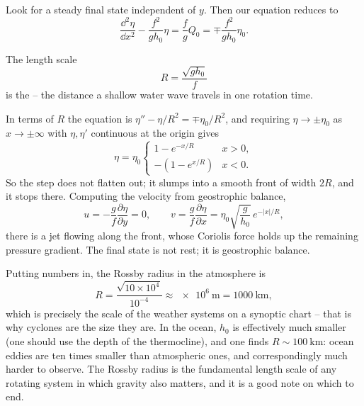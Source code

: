 \documentclass[a4paper]{scrartcl}
\newcommand{\pd}[2]{\frac{\partial #1}{\partial #2}}
\begin{document}
\begin{example}
	Look for a steady final state independent of $y$. Then our equation reduces to
	$$
	\frac{\dd^2\eta}{\dd x^2} - \frac{f^2}{gh_0}\eta = \frac{f}{g}Q_0 = \mp\frac{f^2}{gh_0}\eta_0.
	$$

	\begin{definition}
		The length scale
		$$
		R = \frac{\sqrt{gh_0}}{f}
		$$
		is the  -- the distance a shallow water wave travels in one rotation time.
	\end{definition}

	In terms of $R$ the equation is $\eta'' - \eta/R^2 = \mp\eta_0/R^2$, and requiring $\eta \to \pm\eta_0$ as $x \to \pm\infty$ with $\eta, \eta'$ continuous at the origin gives
	$$
	\eta = \eta_0 \begin{cases} 1 - e^{-x/R} & x > 0, \\ -\left(1 - e^{x/R}\right) & x < 0.\end{cases}
	$$
	So the step does not flatten out; it slumps into a smooth front of width $2R$, and it stops there. Computing the velocity from geostrophic balance,
	$$
	u = -\frac{g}{f}\pd{\eta}{y} = 0, \qquad v = \frac{g}{f}\pd{\eta}{x} = \eta_0\sqrt{\frac{g}{h_0}}\, e^{-|x|/R},
	$$
	there is a jet flowing along the front, whose Coriolis force holds up the remaining pressure gradient. The final state is not rest; it is geostrophic balance.
\end{example}

Putting numbers in, the Rossby radius in the atmosphere is
$$
R = \frac{\sqrt{10\times 10^4}}{10^{-4}} \approx \SI{e6}{\meter} = \SI{1000}{\kilo\meter},
$$
which is precisely the scale of the weather systems on a synoptic chart -- that is why cyclones are the size they are. In the ocean, $h_0$ is effectively much smaller (one should use the depth of the thermocline), and one finds $R \sim \SI{100}{\kilo\meter}$: ocean eddies are ten times smaller than atmospheric ones, and correspondingly much harder to observe. The Rossby radius is the fundamental length scale of any rotating system in which gravity also matters, and it is a good note on which to end.
\end{document}
